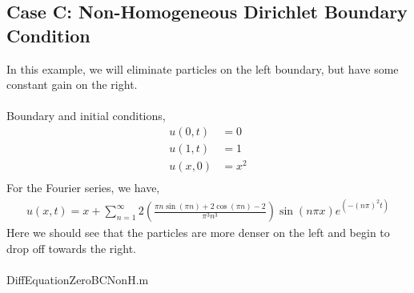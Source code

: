 \documentclass{article}
\begin{document}
\subsection{Case C: Non-Homogeneous Dirichlet Boundary Condition}
In this example, we will eliminate particles on the left boundary, but have some constant gain on the right.
\\
\\
\noindent Boundary and initial conditions,
\[
	\begin{split}
		u(0,t) &= 0 \\
		u(1,t) &= 1 \\
		u(x,0) &= x^2 \\
	\end{split}
\]
For the Fourier series, we have,
\[
	\begin{split}
		u(x,t) = x + \sum^{\infty}_{n=1} 2\left(\frac{\pi n\sin(\pi n)+2\cos(\pi n)-2}{\pi^3 n^3}\right)\sin(n\pi x)e^{(-(n\pi)^2t)}
	\end{split}
\]
Here we should see that the particles are more denser on the left and begin to drop off towards the right.
\\
\\
\noindent DiffEquationZeroBCNonH.m
\end{document}
